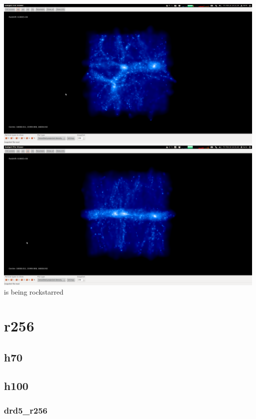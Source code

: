 \documentclass[a4paper,11pt,fleqn,oneside]{book}
\begin{document}
\includegraphics[scale=0.12]{drdx_h100_r128_2/1.png} 
\includegraphics[scale=0.12]{drdx_h100_r128_2/2.png} 
is being rockstarred 




\newpage
\section{r256} %

\newpage
\subsection{h70} %
 
\newpage
\subsection{h100} %

\subsubsection{drd5\_r256} 
\end{document}
